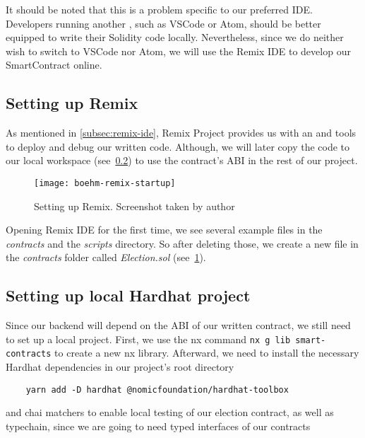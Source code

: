 It should be noted that this is a problem specific to our preferred \gls{IDE}.
Developers running another , such as VSCode or Atom, should be better equipped to write their Solidity code locally.
Nevertheless, since we do neither wish to switch to VSCode nor Atom, we will use the Remix \gls{IDE} to develop our \gls{SmartContract} online.

\subsection{Setting up Remix}\label{subsec:setting-up-remix}

As mentioned in \cref{subsec:remix-ide}, Remix Project provides us with an  and tools to deploy and debug our written code.
Although, we will later copy the code to our local workspace (see~\cref{subsec:setting-up-local-hardhat-project}) to use the contract's \gls{ABI} in the rest of our project.

\begin{figure}[h]
    \centering
    \texttt{[image: boehm-remix-startup]}
    \caption[Setting up Remix]{Setting up Remix. Screenshot taken by author}
    \label{fig:remix-setup}
\end{figure}

Opening Remix \gls{IDE} for the first time, we see several example files in the \emph{contracts} and the \emph{scripts} directory.
So after deleting those, we create a new file in the \emph{contracts} folder called \emph{Election.sol} (see~\cref{fig:remix-setup}).

\subsection{Setting up local Hardhat project}\label{subsec:setting-up-local-hardhat-project}

Since our backend will depend on the \gls{ABI} of our written contract, we still need to set up a local project.
First, we use the nx command \texttt{nx g lib smart-contracts} to create a new nx library.
Afterward, we need to install the necessary Hardhat dependencies in our project's root directory

\begin{verbatim}
    yarn add -D hardhat @nomicfoundation/hardhat-toolbox
\end{verbatim}

and chai matchers to enable local testing of our election contract, as well as typechain, since we are going to need typed interfaces of our contracts


